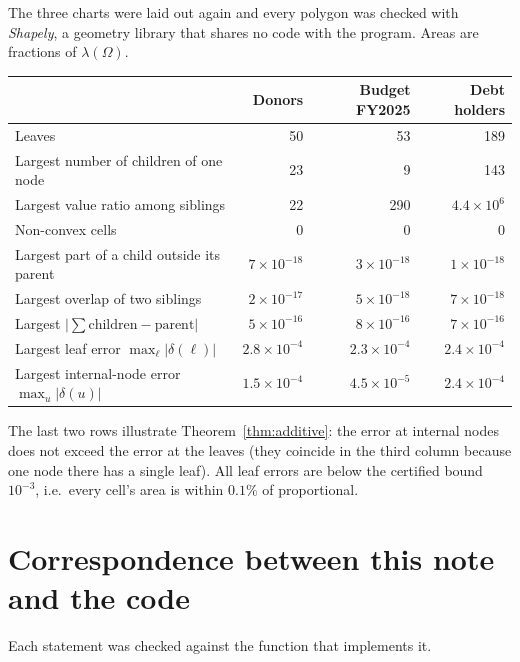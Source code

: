 \documentclass[11pt,a4paper]{article}
\theoremstyle{plain}
\theoremstyle{definition}
\theoremstyle{remark}
\newcommand{\area}{\lambda}
\begin{document}
The three charts were laid out again and every polygon was checked with
\emph{Shapely}, a geometry library that shares no code with the program. Areas
are fractions of $\area(\Omega)$.

\begin{center}
\begin{tabular}{@{}lrrr@{}}
\toprule
 & Donors & Budget FY2025 & Debt holders \\
\midrule
Leaves & 50 & 53 & 189 \\
Largest number of children of one node & 23 & 9 & 143 \\
Largest value ratio among siblings & 22 & 290 & $4.4\times10^{6}$ \\
Non-convex cells & 0 & 0 & 0 \\
Largest part of a child outside its parent & $7\times10^{-18}$ & $3\times10^{-18}$ & $1\times10^{-18}$ \\
Largest overlap of two siblings & $2\times10^{-17}$ & $5\times10^{-18}$ & $7\times10^{-18}$ \\
Largest $\lvert\sum\text{children}-\text{parent}\rvert$ & $5\times10^{-16}$ & $8\times10^{-16}$ & $7\times10^{-16}$ \\
Largest leaf error $\max_\ell\lvert\delta(\ell)\rvert$ & $2.8\times10^{-4}$ & $2.3\times10^{-4}$ & $2.4\times10^{-4}$ \\
Largest internal-node error $\max_u\lvert\delta(u)\rvert$ & $1.5\times10^{-4}$ & $4.5\times10^{-5}$ & $2.4\times10^{-4}$ \\
\bottomrule
\end{tabular}
\end{center}

\noindent
The last two rows illustrate Theorem~\ref{thm:additive}: the error at
internal nodes does not exceed the error at the leaves (they coincide in the third column because one node there has a single leaf). All leaf errors are
below the certified bound $10^{-3}$, i.e.\ every cell's area is within
$0.1\%$ of proportional.

\section{Correspondence between this note and the code}

Each statement was checked against the function that implements it.
\end{document}

